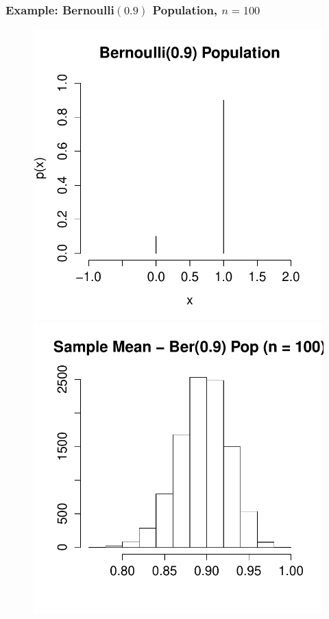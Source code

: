\begin{frame}
\frametitle{Example: Bernoulli$(0.9)$ Population, $n =100$}
\begin{figure}
\centering
\includegraphics[scale = 0.4]{./images/bernoulli_bad}
\includegraphics[scale = 0.4]{./images/xbar_bernoulli_fixed}
\end{figure}
\end{frame}

